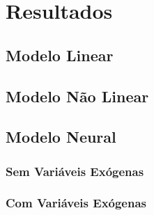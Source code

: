 \chapter{Resultados}


\section{Modelo Linear}


\section{Modelo Não Linear}


\section{Modelo Neural}
\subsection{Sem Variáveis Exógenas}


\subsection{Com Variáveis Exógenas}

